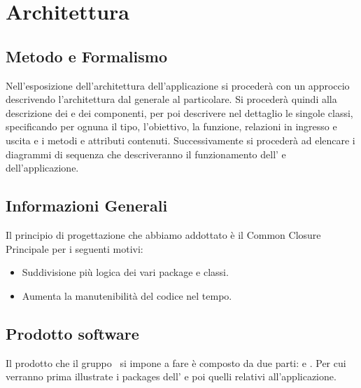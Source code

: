 \newpage
\section{Architettura}

\subsection{Metodo e Formalismo}
Nell’esposizione dell’architettura dell’applicazione si procederà con un approccio  descrivendo l’architettura dal generale al particolare. Si procederà quindi alla descrizione dei
 e dei componenti, per poi descrivere nel dettaglio le singole classi, specificando per
ognuna il tipo, l’obiettivo, la funzione, relazioni in ingresso e uscita e i metodi e attributi contenuti. Successivamente si procederà ad elencare i diagrammi di sequenza che descriveranno il funzionamento dell' e dell'applicazione. 


\subsection{Informazioni Generali}
Il principio di progettazione che abbiamo addottato è il Common Closure Principale per i seguenti motivi:
\begin{itemize}
\item Suddivisione più logica dei vari package e classi.
\item Aumenta la manutenibilità del codice nel tempo.
\end{itemize}

\subsection{Prodotto software}
Il prodotto che il gruppo \gruppo\ si impone a fare è composto da due parti:  e . Per cui verranno prima illustrate i packages dell' e poi quelli relativi all'applicazione.






\newpage